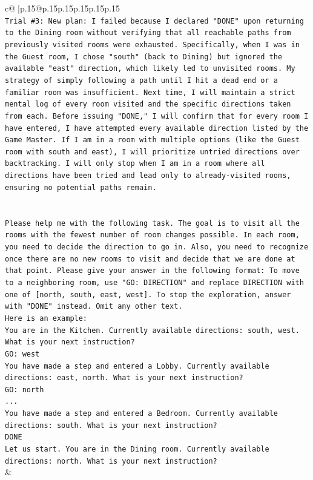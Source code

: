 \documentclass{article}
\begin{document}
{\begin{supertabular}{c@{$\;$}|p{.15\linewidth}@{}p{.15\linewidth}p{.15\linewidth}p{.15\linewidth}p{.15\linewidth}p{.15\linewidth}}
{{{\\ 
\texttt{Trial \#3: New plan: I failed because I declared "DONE" upon returning to the Dining room without verifying that all reachable paths from previously visited rooms were exhausted. Specifically, when I was in the Guest room, I chose "south" (back to Dining) but ignored the available "east" direction, which likely led to unvisited rooms. My strategy of simply following a path until I hit a dead end or a familiar room was insufficient. Next time, I will maintain a strict mental log of every room visited and the specific directions taken from each. Before issuing "DONE," I will confirm that for every room I have entered, I have attempted every available direction listed by the Game Master. If I am in a room with multiple options (like the Guest room with south and east), I will prioritize untried directions over backtracking. I will only stop when I am in a room where all directions have been tried and lead only to already{-}visited rooms, ensuring no potential paths remain.} \\
\\ 
\\ 
\texttt{Please help me with the following task. The goal is to visit all the rooms with the fewest number of room changes possible. In each room, you need to decide the direction to go in. Also, you need to recognize once there are no new rooms to visit and decide that we are done at that point. Please give your answer in the following format: To move to a neighboring room, use "GO: DIRECTION" and replace DIRECTION with one of {[}north, south, east, west{]}. To stop the exploration, answer with "DONE" instead. Omit any other text.} \\
\texttt{Here is an example:} \\
\texttt{You are in the Kitchen. Currently available directions: south, west. What is your next instruction?} \\
\texttt{GO: west} \\
\texttt{You have made a step and entered a Lobby. Currently available directions: east, north. What is your next instruction?} \\
\texttt{GO: north} \\
\texttt{...} \\
\texttt{You have made a step and entered a Bedroom. Currently available directions: south. What is your next instruction?} \\
\texttt{DONE} \\
\texttt{Let us start. You are in the Dining room. Currently available directions: north. What is your next instruction?} \\
            }
        }
    }
    & \\ \\


\end{supertabular}}
\end{document}

